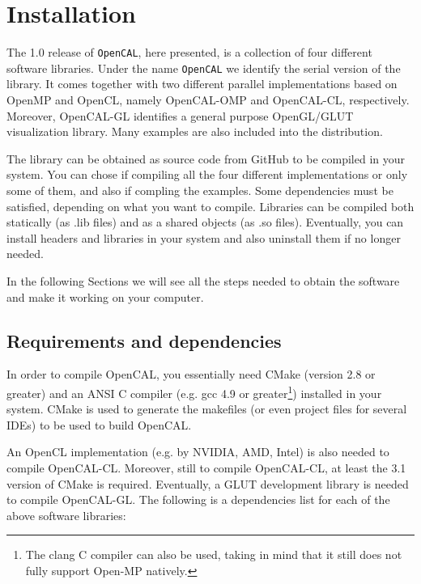 \chapter{Installation} \label{ch:installation}

The 1.0 release of \verb'OpenCAL', here presented, is a collection of
four different software libraries. Under the name \verb'OpenCAL' we
identify the serial version of the library. It comes together with two
different parallel implementations based on OpenMP and OpenCL, namely
OpenCAL-OMP and OpenCAL-CL, respectively. Moreover, OpenCAL-GL
identifies a general purpose OpenGL/GLUT visualization library. Many
examples are also included into the distribution.

The library can be obtained as source code from GitHub to be compiled
in your system. You can chose if compiling all the four different
implementations or only some of them, and also if compling the
examples. Some dependencies must be satisfied, depending on what you
want to compile. Libraries can be compiled both statically (as .lib
files) and as a shared objects (as .so files). Eventually, you can
install headers and libraries in your system and also uninstall them
if no longer needed.

In the following Sections we will see all the steps needed to obtain
the software and make it working on your computer.


\section{Requirements and dependencies}

In order to compile OpenCAL, you essentially need CMake (version 2.8
or greater) and an ANSI C compiler (e.g. gcc 4.9 or greater\footnote{
  The clang C compiler can also be used, taking in mind that it still
  does not fully support Open-MP natively.}) installed in your
system. CMake is used to generate the makefiles (or even project
files for several IDEs) to be used to build OpenCAL.

An OpenCL implementation (e.g. by NVIDIA, AMD, Intel) is also needed
to compile OpenCAL-CL. Moreover, still to compile OpenCAL-CL, at least
the 3.1 version of CMake is required. Eventually, a GLUT development
library is needed to compile OpenCAL-GL. The following is a
dependencies list for each of the above software libraries:

